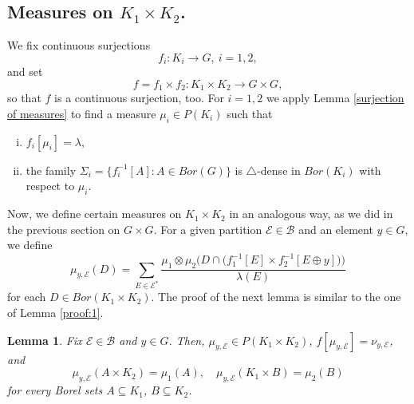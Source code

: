 \documentclass[12pt,fleqn]{amsart}
\numberwithin{equation}{section}
\newtheorem{lemma}[thm]{Lemma}
\theoremstyle{definition}
\newcommand{\cE}{\mathcal E}
\newcommand{\sub}{\subseteq}
\begin{document}
\subsection{Measures on $K_1\times K_2$.}
We fix continuous surjections
\[f_i\colon K_i\to G,\ i=1,2,\]
and set 
\[f=f_1\times f_2\colon  K_1\times K_2\to G\times G,\]
so that $f$ is a continuous surjection, too. %
For $i=1,2$ we apply Lemma \ref{surjection of measures} to find a measure $\mu_i\in P(K_i)$ such that 
\begin{enumerate}[(i)]
\item $f_i[\mu_i]=\lambda$,
\item the family $\Sigma_i=\big\{f_i^{-1}[A]\colon  A\in Bor(G)\big\}$ is
$\bigtriangleup$-dense in $Bor(K_i)$ with respect to $\mu_i$.
\end{enumerate}

Now, we define certain measures on $K_1 \times K_2$ in an analogous way, as we did in the previous section on $G \times G$.
For a given partition $\cE \in \mathcal{B}$ and an element $y\in G$, we
define
\[ \mu_{y,\cE}(D)=\sum_{E\in\cE^{\ast}}\frac{\mu_1\otimes\mu_2 \Big( D\cap \big( f_1^{-1}[E]\times f_2^{-1}[E\oplus y]\big)\Big)}{\lambda(E)}\]
for each $D\in Bor(K_1 \times K_2)$. %
The proof of the next lemma is similar to the one of Lemma \ref{proof:1}.

\begin{lemma}\label{proof:3}
Fix $\cE \in \mathcal{B}$ and $y\in G$. Then, $\mu_{y,\cE}\in P(K_1\times K_2)$, $f[\mu_{y,\cE}]=\nu_{y,\cE}$, and
\[\mu_{y,\cE}(A\times K_2)=\mu_1(A), \quad \mu_{y,\cE}(K_1\times B)=\mu_2(B)\]
for every Borel sets $A\sub K_1$, $B\sub K_2$.
\end{lemma}
\end{document}
